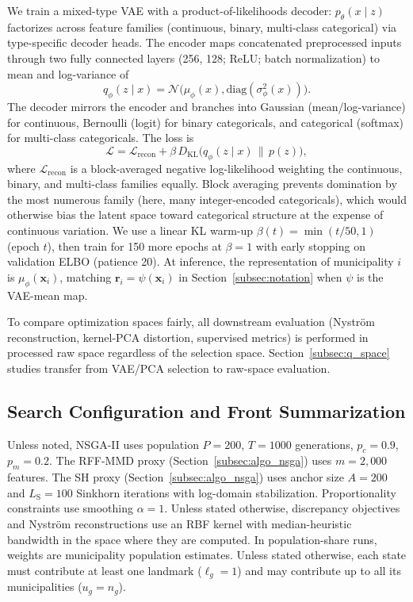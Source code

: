 \documentclass[10pt,journal]{IEEEtran}
\newcommand{\popSize}{200}
\newcommand{\nGen}{1000}
\newcommand{\1}{\mathbf{1}}
\newcommand{\bx}{\mathbf{x}}
\newcommand{\br}{\mathbf{r}}
\theoremstyle{ieeethm}
\begin{document}
We train a mixed-type VAE with a product-of-likelihoods decoder: $p_\theta(x\mid z)$ factorizes across feature families (continuous, binary, multi-class categorical) via type-specific decoder heads. The encoder maps concatenated preprocessed inputs through two fully connected layers (256, 128; ReLU; batch normalization) to mean and log-variance of
\begin{equation*}
q_\phi(z\mid x)
=
\mathcal N\big(\mu_\phi(x),\mathrm{diag}(\sigma^2_\phi(x))\big).
\end{equation*}
The decoder mirrors the encoder and branches into Gaussian (mean/log-variance) for continuous, Bernoulli (logit) for binary categoricals, and categorical (softmax) for multi-class categoricals. The loss is
\begin{equation*}
\mathcal L
=
\mathcal L_{\mathrm{recon}}
+
\beta\,D_{\mathrm{KL}}\!\big(q_\phi(z\mid x)\,\big\|\,p(z)\big),
\end{equation*}
where $\mathcal L_{\mathrm{recon}}$ is a block-averaged negative log-likelihood weighting the continuous, binary, and multi-class families equally. Block averaging prevents domination by the most numerous family (here, many integer-encoded categoricals), which would otherwise bias the latent space toward categorical structure at the expense of continuous variation. We use a linear KL warm-up $\beta(t)=\min(t/50,1)$ (epoch $t$), then train for 150 more epochs at $\beta=1$ with early stopping on validation ELBO (patience 20). At inference, the representation of municipality $i$ is $\mu_\phi(\bx_i)$, matching $\br_i=\psi(\bx_i)$ in Section~\ref{subsec:notation} when $\psi$ is the VAE-mean map.

To compare optimization spaces fairly, all downstream evaluation (Nyström reconstruction, kernel-PCA distortion, supervised metrics) is performed in processed raw space regardless of the selection space. Section~\ref{subsec:q_space} studies transfer from VAE/PCA selection to raw-space evaluation.

\subsection{Search Configuration and Front Summarization}
\label{subsec:search_config}

Unless noted, NSGA-II uses population $P=\popSize$, $T=\nGen$ generations, $p_c=0.9$, $p_m=0.2$. The RFF-MMD proxy (Section~\ref{subsec:algo_nsga}) uses $m=2{,}000$ features. The SH proxy (Section~\ref{subsec:algo_nsga}) uses anchor size $A=200$ and $L_{\mathrm{S}}=100$ Sinkhorn iterations with log-domain stabilization. Proportionality constraints use smoothing $\alpha=1$. Unless stated otherwise, discrepancy objectives and Nyström reconstructions use an RBF kernel with median-heuristic bandwidth in the space where they are computed. In population-share runs, weights are municipality population estimates. Unless stated otherwise, each state must contribute at least one landmark ($\ell_g=1$) and may contribute up to all its municipalities ($u_g=n_g$).
\end{document}
